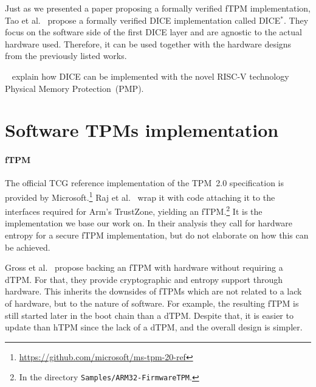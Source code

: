 Just as we presented a paper proposing a formally verified \ac{fTPM} implementation, Tao et al.~\cite{272306} propose a formally verified \ac{DICE} implementation called DICE\( ^* \).
They focus on the software side of the first DICE layer and are agnostic to the actual hardware used.
Therefore, it can be used together with the hardware designs from the previously listed works.

~\cite{Bravi2023} explain how DICE can be implemented with the novel RISC-V technology Physical Memory Protection~(PMP).

\section{Software \acsp{TPM} implementation}



\paragraph{\Acl{fTPM}}

The official \ac{TCG} reference implementation of the TPM~2.0 specification is provided by Microsoft.\footnote{\url{https://github.com/microsoft/ms-tpm-20-ref}}
Raj et al.~\cite{Raj2015} wrap it with code attaching it to the interfaces required for Arm's TrustZone, yielding an \ac{fTPM}.\footnote{In the directory \texttt{Samples/ARM32-FirmwareTPM}.}
It is the implementation we base our work on.
In their analysis they call for hardware entropy for a secure \ac{fTPM} implementation, but do not elaborate on how this can be achieved.

Gross et al.~\cite{Gross2021} propose backing an \ac{fTPM} with hardware without requiring a \ac{dTPM}.
For that, they provide cryptographic and entropy support through hardware.
This inherits the downsides of \acp{fTPM} which are not related to a lack of hardware, but to the nature of software.
For example, the resulting \ac{fTPM} is still started later in the boot chain than a \ac{dTPM}\@.
Despite that, it is easier to update than hTPM since the lack of a dTPM, and the overall design is simpler.

